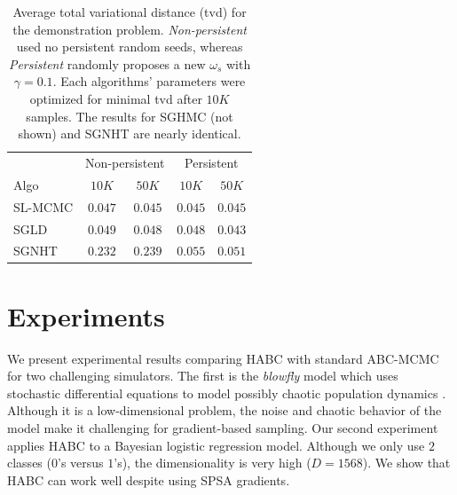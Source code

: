 \documentclass[]{article}
\begin{document}
\begin{table}[h]
  \vspace{-0.1in}
\caption{Average total variational distance (tvd) for the demonstration problem.  {\em Non-persistent} used no persistent random seeds, whereas {\em Persistent} randomly proposes a new $\omega_s$ with $\gamma=0.1$. Each algorithms' parameters were optimized for minimal tvd after $10K$ samples.  The results for SGHMC (not shown) and SGNHT are nearly identical.  
}
\label{tab:exp-posterior}
\begin{center}
\begin{tabular}{l|c|c||c|c|}
  \cline{2-5}
 & \multicolumn{2}{|c||}{Non-persistent} & \multicolumn{2}{c|}{Persistent} \\
 \cline{1-5} 
\multicolumn{1}{|l|}{Algo} & $10K$ & $50K$ & $10K$ & $50K$ \\ \hline \hline 
\multicolumn{1}{|l|}{SL-MCMC} & $0.047$ & $0.045$ & $0.045$ & $0.045$ \\
\multicolumn{1}{|l|}{SGLD} & $0.049$ & $0.048$ & $0.048$ & $0.043$ \\
\multicolumn{1}{|l|}{SGNHT} & $0.232$ & $0.239$ & $0.055$ & $0.051$ \\\hline 
\end{tabular}
\end{center}
\end{table}
\vspace{-0.2in}

\section{Experiments}\label{sec:experiments}
We present experimental results comparing HABC with standard ABC-MCMC for two challenging simulators.   The first is the {\em blowfly} model which uses stochastic differential equations to model possibly chaotic population dynamics \cite{wood2010statistical}.  Although it is a low-dimensional problem, the noise and chaotic behavior of the model make it challenging for gradient-based sampling.  Our second experiment applies HABC to a Bayesian logistic regression model.  Although we only use $2$ classes ($0$'s versus $1$'s), the dimensionality is very high ($D=1568$).  We show that HABC can work well despite using SPSA  gradients.
\end{document}
